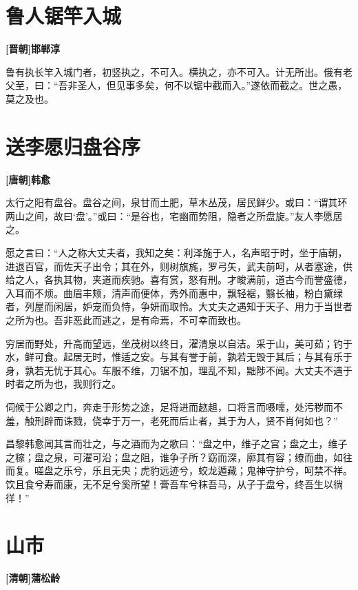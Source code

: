 \documentclass[UTF8,titlepage,oneside]{ctexbook}
\begin{document}
\chapter*{鲁人锯竿入城}
\begin{center}
	\textbf{[晋朝]邯郸淳}
\end{center}


鲁有执长竿入城门者，初竖执之，不可入。横执之，亦不可入。计无所出。俄有老父至，曰：“吾非圣人，但见事多矣，何不以锯中截而入。”遂依而截之。世之愚，莫之及也。

\chapter*{送李愿归盘谷序}
\begin{center}
	\textbf{[唐朝]韩愈}
\end{center}

太行之阳有盘谷。盘谷之间，泉甘而土肥，草木丛茂，居民鲜少。或曰：“谓其环两山之间，故曰‘盘’。”或曰：“是谷也，宅幽而势阻，隐者之所盘旋。”友人李愿居之。

愿之言曰：“人之称大丈夫者，我知之矣：利泽施于人，名声昭于时，坐于庙朝，进退百官，而佐天子出令；其在外，则树旗旄，罗弓矢，武夫前呵，从者塞途，供给之人，各执其物，夹道而疾驰。喜有赏，怒有刑。才畯满前，道古今而誉盛德，入耳而不烦。曲眉丰颊，清声而便体，秀外而惠中，飘轻裾，翳长袖，粉白黛绿者，列屋而闲居，妒宠而负恃，争妍而取怜。大丈夫之遇知于天子、用力于当世者之所为也。吾非恶此而逃之，是有命焉，不可幸而致也。

穷居而野处，升高而望远，坐茂树以终日，濯清泉以自洁。采于山，美可茹；钓于水，鲜可食。起居无时，惟适之安。与其有誉于前，孰若无毁于其后；与其有乐于身，孰若无忧于其心。车服不维，刀锯不加，理乱不知，黜陟不闻。大丈夫不遇于时者之所为也，我则行之。

伺候于公卿之门，奔走于形势之途，足将进而趑趄，口将言而嗫嚅，处污秽而不羞，触刑辟而诛戮，侥幸于万一，老死而后止者，其于为人，贤不肖何如也？”

昌黎韩愈闻其言而壮之，与之酒而为之歌曰：“盘之中，维子之宫；盘之土，维子之稼；盘之泉，可濯可沿；盘之阻，谁争子所？窈而深，廓其有容；缭而曲，如往而复。嗟盘之乐兮，乐且无央；虎豹远迹兮，蛟龙遁藏；鬼神守护兮，呵禁不祥。饮且食兮寿而康，无不足兮奚所望！膏吾车兮秣吾马，从子于盘兮，终吾生以徜徉！”


\chapter*{山市}
\begin{center}
	\textbf{[清朝]蒲松龄}
\end{center}
\end{document}

